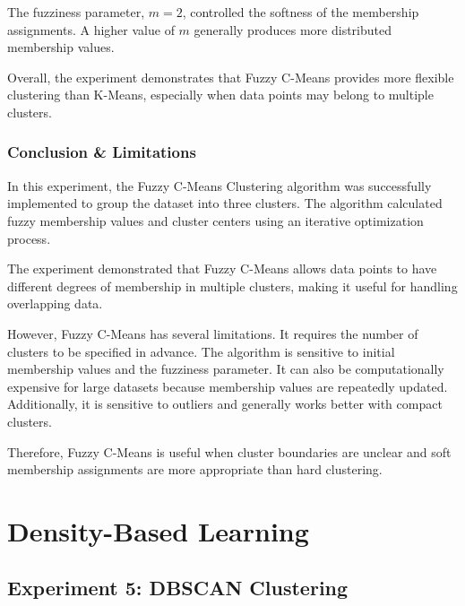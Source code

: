 \documentclass[a4paper,11pt]{article}
\begin{document}
The fuzziness parameter, $m = 2$, controlled the softness of the membership assignments. A higher value of $m$ generally produces more distributed membership values.

Overall, the experiment demonstrates that Fuzzy C-Means provides more flexible clustering than K-Means, especially when data points may belong to multiple clusters.

\subsubsection{Conclusion \& Limitations}

In this experiment, the Fuzzy C-Means Clustering algorithm was successfully implemented to group the dataset into three clusters. The algorithm calculated fuzzy membership values and cluster centers using an iterative optimization process.

The experiment demonstrated that Fuzzy C-Means allows data points to have different degrees of membership in multiple clusters, making it useful for handling overlapping data.

However, Fuzzy C-Means has several limitations. It requires the number of clusters to be specified in advance. The algorithm is sensitive to initial membership values and the fuzziness parameter. It can also be computationally expensive for large datasets because membership values are repeatedly updated. Additionally, it is sensitive to outliers and generally works better with compact clusters.

Therefore, Fuzzy C-Means is useful when cluster boundaries are unclear and soft membership assignments are more appropriate than hard clustering.



\section{Density-Based Learning}

\subsection{Experiment 5: DBSCAN Clustering}
\end{document}
